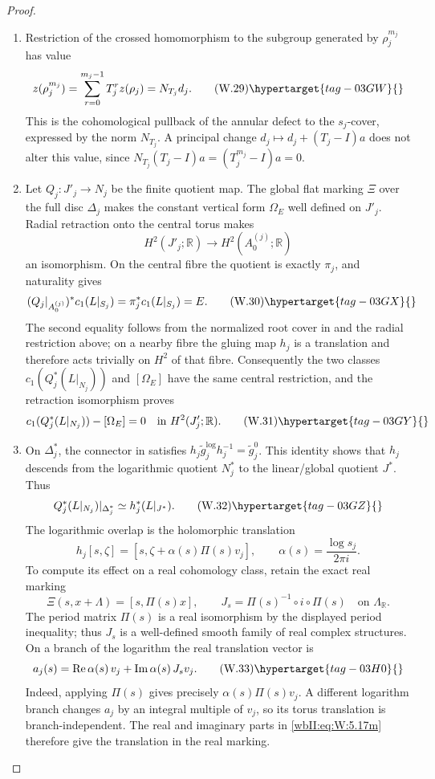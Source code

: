 \begin{proof}

\begin{enumerate}[label=\arabic*.,leftmargin=*]
\item Restriction of the crossed homomorphism to the subgroup generated by
$\rho_j^{m_j}$ has value
\[
 z(\rho_j^{m_j})
 =\sum_{r=0}^{m_j-1}T_j^rz(\rho_j)=N_{T_j}d_j.
\tag{W.29}\hypertarget{tag-03GW}{}\label{wbII:eq:W:5.17l}
\]
This is the cohomological pullback of the annular defect to the
$s_j$-cover, expressed by the norm $N_{T_j}$.  A principal change
$d_j\mapsto d_j+(T_j-I)a$ does not alter this value, since
$N_{T_j}(T_j-I)a=(T_j^{m_j}-I)a=0$.

\item Let $Q_j:J'_j\to N_j$ be the finite quotient map.  The global flat marking
$\Xi$ over the full disc $\Delta_j$ makes the constant vertical form
$\Omega_E$ well defined on $J'_j$.  Radial retraction onto the central
torus makes
\[
 H^2(J'_j;\mathbb R)\longrightarrow H^2(A_0^{(j)};\mathbb R)
\]
an isomorphism.  On the central fibre the quotient is exactly $\pi_j$, and
naturality gives
\[
 (Q_j|_{A_0^{(j)}})^*c_1(L|_{S_j})
 =\pi_j^*c_1(L|_{S_j})=E.
\tag{W.30}\hypertarget{tag-03GX}{}\label{wbII:eq:W:5.17l'}
\]
The second equality follows from the normalized root cover in
 and the radial restriction above; on a nearby fibre the gluing map $h_j$
is a translation and therefore acts trivially on $H^2$ of that fibre.
Consequently the two classes
$c_1(Q_j^*(L|_{N_j}))$ and $[\Omega_E]$ have the same central restriction,
and the retraction isomorphism proves
\[
 c_1(Q_j^*(L|_{N_j}))-[\Omega_E]=0
 \quad\text{in }H^2(J'_j;\mathbb R).
\tag{W.31}\hypertarget{tag-03GY}{}\label{wbII:eq:W:5.17l''}
\]

\item On $\Delta_j^*$, the connector in
 satisfies
$h_j\widetilde g_j^{\log}h_j^{-1}=\widetilde g_j^0$.  This identity shows that $h_j$
descends from the logarithmic quotient $N_j^*$ to the linear/global
quotient $J^*$.  Thus
\[
 Q_j^*(L|_{N_j})|_{\Delta_j^*}
 \simeq h_j^*(L|_{J^*}).
\tag{W.32}\hypertarget{tag-03GZ}{}\label{wbII:eq:W:5.17l'''}
\]
The logarithmic overlap is the holomorphic translation
\[
 h_j[s,\zeta]=[s,\zeta+\alpha(s)\Pi(s)v_j],
 \qquad \alpha(s)=\frac{\log s_j}{2\pi i}.
\]
To compute its effect on a real cohomology class, retain the exact
real marking
\[
 \Xi(s,x+\Lambda)=[s,\Pi(s)x],\qquad
 J_s=\Pi(s)^{-1}\circ i\circ\Pi(s)
 \quad\text{on }\Lambda_{\mathbb R}.
\]
The period matrix \(\Pi(s)\) is a real isomorphism by the displayed period inequality;
thus \(J_s\) is a well-defined smooth family of real complex
structures.  On a branch of the logarithm the real
translation vector is
\[
 a_j(s)=\operatorname{Re}\alpha(s)\,v_j+
        \operatorname{Im}\alpha(s)\,J_s v_j.
 \tag{W.33}\hypertarget{tag-03H0}{}\label{wbII:eq:W:5.17m}
\]
Indeed, applying \(\Pi(s)\) gives precisely
\(\alpha(s)\Pi(s)v_j\).  A different logarithm branch changes
\(a_j\) by an integral multiple of \(v_j\), so its torus translation
is branch-independent.  The real and imaginary parts in \eqref{wbII:eq:W:5.17m} therefore give
the translation in the real marking.


\end{enumerate}
\end{proof}
